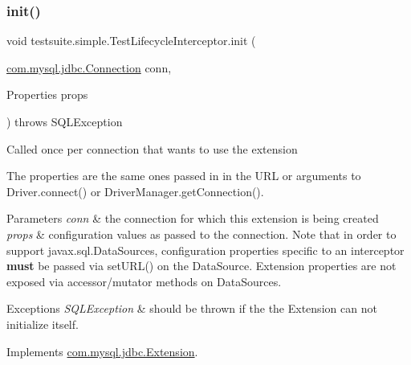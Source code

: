 \subsubsection{\texorpdfstring{init()}{init()}}
{\footnotesize\ttfamily void testsuite.\+simple.\+Test\+Lifecycle\+Interceptor.\+init (\begin{DoxyParamCaption}\item[{\mbox{\hyperlink{interfacecom_1_1mysql_1_1jdbc_1_1_connection}{com.\+mysql.\+jdbc.\+Connection}}}]{conn,  }\item[{Properties}]{props }\end{DoxyParamCaption}) throws S\+Q\+L\+Exception}

Called once per connection that wants to use the extension

The properties are the same ones passed in in the U\+RL or arguments to Driver.\+connect() or Driver\+Manager.\+get\+Connection().


\begin{DoxyParams}{Parameters}
{\em conn} & the connection for which this extension is being created \\
\hline
{\em props} & configuration values as passed to the connection. Note that in order to support javax.\+sql.\+Data\+Sources, configuration properties specific to an interceptor {\bfseries must} be passed via set\+U\+R\+L() on the Data\+Source. Extension properties are not exposed via accessor/mutator methods on Data\+Sources.\\
\hline
\end{DoxyParams}

\begin{DoxyExceptions}{Exceptions}
{\em S\+Q\+L\+Exception} & should be thrown if the the Extension can not initialize itself. \\
\hline
\end{DoxyExceptions}


Implements \mbox{\hyperlink{interfacecom_1_1mysql_1_1jdbc_1_1_extension_a79427811058193260bd4df0c38414e88}{com.\+mysql.\+jdbc.\+Extension}}.

\mbox{\label{classtestsuite_1_1simple_1_1_test_lifecycle_interceptor_a7cdeb42f7891e22dadce89627befbcdf}} 
